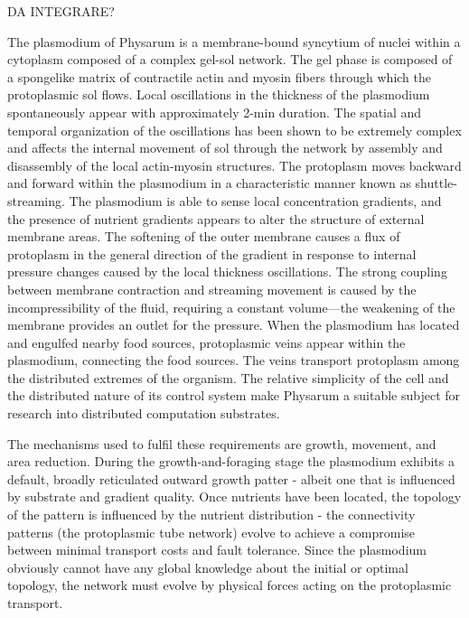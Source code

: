 \par
DA INTEGRARE? 
\par
The plasmodium of Physarum is a membrane-bound syncytium of nuclei within a cytoplasm composed of a complex gel-sol network. The gel phase is composed of a spongelike matrix of contractile actin and myosin fibers through which the protoplasmic sol flows. Local oscillations in the thickness of the plasmodium spontaneously appear with approximately 2-min duration. The spatial and temporal organization of the oscillations has been shown to be extremely complex and affects the internal movement of sol through the network by assembly and disassembly of the local actin-myosin structures. The protoplasm moves backward and forward within the plasmodium in a characteristic manner known as shuttle-streaming.
The plasmodium is able to sense local concentration gradients, and the presence of nutrient gradients appears to alter the structure of external membrane areas. The softening of the outer membrane causes a flux of protoplasm in the general direction of the gradient in response to internal pressure changes caused by the local thickness oscillations. The strong coupling between membrane contraction and streaming movement is caused by the incompressibility of the fluid, requiring a constant volume—the weakening of the membrane provides an outlet for the pressure. When the plasmodium has located and engulfed nearby food sources, protoplasmic veins appear within the plasmodium, connecting the food sources. The veins transport protoplasm among the distributed extremes of the organism.
The relative simplicity of the cell and the distributed nature of its control system make Physarum a suitable subject for research into distributed computation substrates. \cite{jones2010characteristics}

The mechanisms used to fulfil these requirements are growth, movement, and area reduction. During the growth-and-foraging stage the plasmodium exhibits a default, broadly reticulated outward growth patter - albeit one that is influenced by substrate and gradient quality. Once nutrients have been located, the topology of the pattern is influenced by the nutrient distribution - the connectivity patterns (the protoplasmic tube network) evolve to achieve a compromise between minimal transport costs and
fault tolerance. Since the plasmodium obviously cannot have any global knowledge about the initial or optimal topology, the network must evolve by physical forces acting on the protoplasmic transport.




